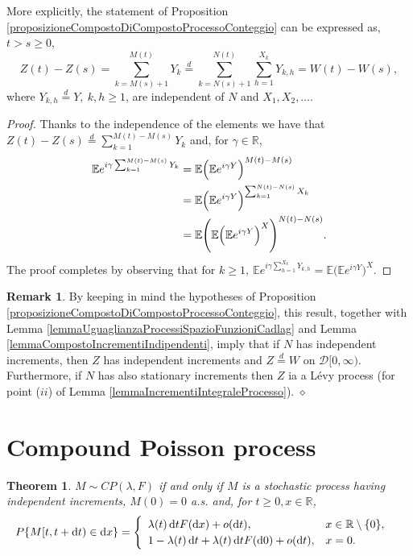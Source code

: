 \documentclass[12pt, twoside, english, headsepline]{article}
\newcommand*\dif{\mathop{}\!\mathrm{d}}  %
\newtheorem{theorem}{Theorem}[section] %
\theoremstyle{definition} %
\newtheorem{remark}{Remark}[section] %
\numberwithin{equation}{section} %
\begin{document}
More explicitly, the statement of Proposition \ref{proposizioneCompostoDiCompostoProcessoConteggio} can be expressed as, $t>s\ge0$,
\begin{equation}\label{uguaglianzaDistribuzioneCompostoDiCompostoProcessoConteggio}
	Z(t)-Z(s) = \sum_{k=M(s)+1}^{M(t)} Y_k \stackrel{d}{=} \sum_{k=N(s)+1}^{N(t)} \sum_{h=1}^{X_k} Y_{k,h} = W(t)-W(s),
\end{equation}
where $Y_{k,h}\stackrel{d}{=}Y,\ k,h\ge1$, are independent of $N$ and $X_1,X_2,\dots$.

\begin{proof}
	Thanks to the independence of the elements we have that $Z(t)-Z(s) \stackrel{d}{=} \sum_{k=1}^{M(t)-M(s)} Y_k$ and, for $\gamma\in\mathbb{R}$,
	\begin{align*}
		\mathbb{E}e^{i\gamma \sum_{k=1}^{M(t)-M(s)} Y_k} &= 	\mathbb{E} \Bigl(	\mathbb{E}e^{i\gamma Y} \Big)^{M(t)-M(s)} \\
		& =\mathbb{E} \Bigl( \mathbb{E}e^{i\gamma Y} \Big)^{\sum_{k=1}^{N(t)-N(s)} X_k} \\
		& = 	\mathbb{E} \Bigg( 	\mathbb{E}\Big( 	\mathbb{E}e^{i\gamma Y}\Big)^X \Bigg)^{N(t)-N(s)}.
	\end{align*}
	The proof completes by observing that for $k\ge1, \ \mathbb{E}e^{i\gamma \sum_{h=1}^{X_k} Y_{k,h} } =\mathbb{E}\Big(\mathbb{E}e^{i\gamma Y}\Big)^X$.
\end{proof}


\begin{remark}\label{remarkUguaglianzaSuSpazioFunzioniContinueCompoundDiCompound}
	By keeping in mind the hypotheses of Proposition \ref{proposizioneCompostoDiCompostoProcessoConteggio}, this result, together with Lemma \ref{lemmaUguaglianzaProcessiSpazioFunzioniCadlag} and Lemma \ref{lemmaCompostoIncrementiIndipendenti}, imply that if $N$ has independent increments, then $Z$ has independent increments and $Z\stackrel{d}{=}W$ on $\mathcal{D}[0,\infty)$. Furthermore, if $N$ has also stationary increments then $Z$ ia a L\'evy process (for point ($ii$) of Lemma \ref{lemmaIncrementiIntegraleProcesso}). \hfill $\diamond$
\end{remark}


\section{Compound Poisson process}


\begin{theorem}
	$M\sim CP(\lambda, F)$ if and only if $M$ is a stochastic process having independent increments, $M(0)=0$ a.s. and, for $t\ge0, x\in\mathbb{R}$,
	\begin{align}\label{compoundPoissonInfinitesimale}
		P\{M[t,t+\dif t) \in \dif x\} = \begin{cases}
			\begin{array}{l l}
				\lambda(t)\dif t F(\dif x) + o(\dif t), & x\in\mathbb{R}\setminus\{0\},\\
				1-\lambda(t)\dif t + \lambda(t)\dif t F(\dif 0) + o(\dif t), & x = 0.
			\end{array}
		\end{cases} 
	\end{align}
\end{theorem}
\end{document}
